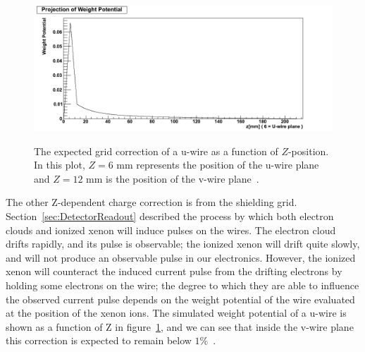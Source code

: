 \begin{figure}
\begin{center}
\includegraphics[keepaspectratio=true,width=\textwidth]{GridCorrectionVsZ.png}
\end{center}
\renewcommand{\baselinestretch}{1}
\small\normalsize
\begin{quote}
\caption{The expected grid correction of a u-wire as a function of $Z$-position.  In this plot, $Z = 6$ mm represents the position of the u-wire plane and $Z = 12$ mm is the position of the v-wire plane~\cite{EnergyDocumentRun2a}.}
\label{fig:GridCorrectionVsZ}
\end{quote}
\end{figure}
\renewcommand{\baselinestretch}{2}
\small\normalsize

The other Z-dependent charge correction is from the shielding grid.  Section~\ref{sec:DetectorReadout} described the process by which both electron clouds and ionized xenon will induce pulses on the wires.  The electron cloud drifts rapidly, and its pulse is observable; the ionized xenon will drift quite slowly, and will not produce an observable pulse in our electronics.  However, the ionized xenon will counteract the induced current pulse from the drifting electrons by holding some electrons on the wire; the degree to which they are able to influence the observed current pulse depends on the weight potential of the wire evaluated at the position of the xenon ions.  The simulated weight potential of a u-wire is shown as a function of Z in figure~\ref{fig:GridCorrectionVsZ}, and we can see that inside the v-wire plane this correction is expected to remain below $1\%$~\cite{EnergyDocumentRun2a}.

